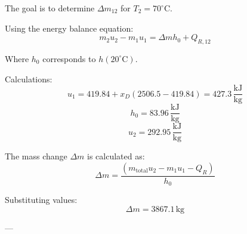 The goal is to determine \( \Delta m_{12} \) for \( T_2 = 70^\circ\text{C} \).  

Using the energy balance equation:  
\[
m_2 u_2 - m_1 u_1 = \Delta m h_0 + Q_{R,12}
\]  

Where \( h_0 \) corresponds to \( h(20^\circ\text{C}) \).  

Calculations:  
\[
u_1 = 419.84 + x_D (2506.5 - 419.84) = 427.3 \, \frac{\text{kJ}}{\text{kg}}
\]  
\[
h_0 = 83.96 \, \frac{\text{kJ}}{\text{kg}}
\]  
\[
u_2 = 292.95 \, \frac{\text{kJ}}{\text{kg}}
\]  

The mass change \( \Delta m \) is calculated as:  
\[
\Delta m = \frac{(m_{\text{total}} u_2 - m_1 u_1 - Q_R)}{h_0}
\]  

Substituting values:  
\[
\Delta m = 3867.1 \, \text{kg}
\]  

---